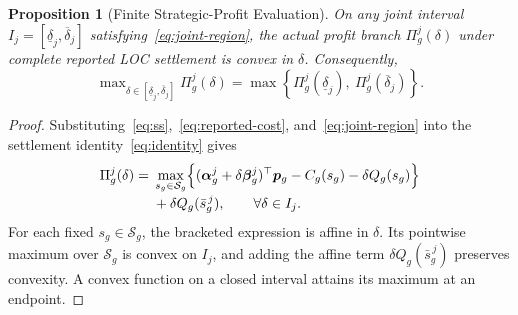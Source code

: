 \documentclass[journal]{IEEEtran}
\newtheorem{proposition}{Proposition}
\newcommand{\bp}{\bm p}
\begin{document}
\begin{proposition}[Finite Strategic-Profit Evaluation]
\label{prop:finite}
On any joint interval $I_j=[\underline{\delta}_j,\overline{\delta}_j]$ satisfying~\eqref{eq:joint-region}, the actual profit branch $\Pi_g^j(\delta)$ under complete reported LOC settlement is convex in $\delta$. Consequently,
\begin{equation}
\max\nolimits_{\delta\in[\underline{\delta}_j,\overline{\delta}_j]} \Pi_g^j(\delta)
= \max\left\{ \Pi_g^j(\underline{\delta}_j),\ \Pi_g^j(\overline{\delta}_j) \right\}.\label{eq:endpoint}
\end{equation}
\end{proposition}

\begin{proof}
Substituting~\eqref{eq:ss},~\eqref{eq:reported-cost}, and~\eqref{eq:joint-region} into the settlement identity~\eqref{eq:identity} gives
\begin{equation}
\begin{aligned}
\Pi_g^j(\delta) ={}& \max_{s_g\in\mathcal{S}_g}\Bigl\{
(\bm{\alpha}_g^j + \delta\bm{\beta}_g^j)^\top\bp_g - C_g(s_g) - \delta Q_g(s_g)
\Bigr\}\\[-2pt]
&+ \delta Q_g(\bar{s}_g^{\,j}), \qquad \forall\delta\in I_j.
\end{aligned}\label{eq:convex-profit}
\end{equation}
For each fixed $s_g\in\mathcal{S}_g$, the bracketed expression is affine in $\delta$. Its pointwise maximum over $\mathcal{S}_g$ is convex on $I_j$, and adding the affine term $\delta Q_g(\bar{s}_g^{\,j})$ preserves convexity. A convex function on a closed interval attains its maximum at an endpoint.
\end{proof}
\end{document}
